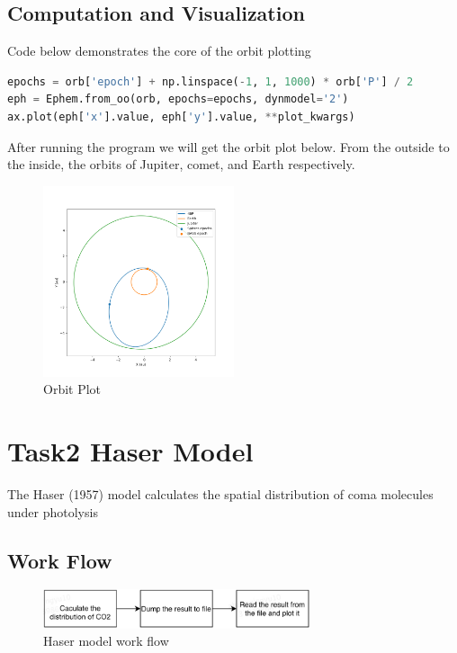 \documentclass{report}
\begin{document}
\subsection{Computation and Visualization}
Code below demonstrates the core of the orbit plotting
\begin{lstlisting}[language=Python]
epochs = orb['epoch'] + np.linspace(-1, 1, 1000) * orb['P'] / 2
eph = Ephem.from_oo(orb, epochs=epochs, dynmodel='2')
ax.plot(eph['x'].value, eph['y'].value, **plot_kwargs)
\end{lstlisting}
After running the program we will get the orbit plot below.
From the outside to the inside, the orbits of Jupiter, comet, and Earth respectively.
\begin{figure}[htb]
    \centering
    \includegraphics[width=0.5\textwidth]{orbit}
    \caption{Orbit Plot}
    \label{fig:OrbitPlot}
\end{figure}

\section{Task2 Haser Model}
The Haser (1957) model calculates the spatial distribution of coma molecules under photolysis

\subsection{Work Flow}
\begin{figure}[htb]
    \centering
    \includegraphics[width=0.7\textwidth]{haser_result}
    \caption{Haser model work flow}
    \label{fig:haser_workflow}
\end{figure}
\end{document}
